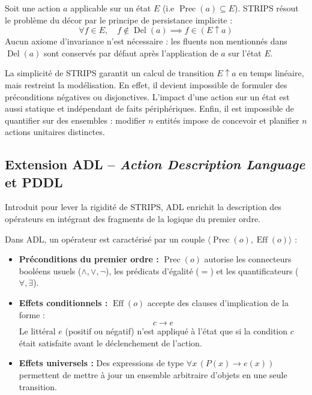 \begin{proposition}
    Soit une action $a$ applicable sur un état $E$ (i.e $\operatorname{Prec}(a) \subseteq E$). STRIPS résout le problème du décor par le principe de persistance implicite :
    \begin{equation}
        \forall f \in E, \quad f \notin \operatorname{Del}(a) \implies f \in (E \uparrow a)
    \end{equation}
    Aucun axiome d'invariance n'est nécessaire : les fluents non mentionnés dans $\operatorname{Del}(a)$ sont conservés par défaut après l'application de $a$ sur l'état $E$. 
\end{proposition}

\begin{remark}
    La simplicité de STRIPS garantit un calcul de transition $E \uparrow a$ en temps linéaire, mais restreint la modélisation. En effet, il devient impossible de formuler des préconditions négatives ou disjonctives. L'impact d'une action sur un état est aussi statique et indépendant de faits périphériques. Enfin, il est impossible de quantifier sur des ensembles : modifier $n$ entités impose de concevoir et planifier $n$ actions unitaires distinctes.
\end{remark}

\subsection{Extension ADL -- \emph{Action Description Language} et PDDL}

Introduit pour lever la rigidité de STRIPS, ADL enrichit la description des opérateurs en intégrant des fragments de la logique du premier ordre.

\begin{definition}
    Dans ADL, un opérateur est caractérisé par un couple $\langle \operatorname{Prec}(o), \operatorname{Eff}(o) \rangle$ :
    \begin{itemize}
        \item \textbf{Préconditions du premier ordre :} $\operatorname{Prec}(o)$ autorise les connecteurs booléens usuels ($\wedge, \vee, \neg$), les prédicats d'égalité ($=$) et les quantificateurs ($\forall, \exists$).
        \item \textbf{Effets conditionnels :} $\operatorname{Eff}(o)$ accepte des clauses d'implication de la forme :
        \begin{equation}
            c \longrightarrow e
        \end{equation}
        Le littéral $e$ (positif ou négatif) n'est appliqué à l'état que si la condition $c$ était satisfaite avant le déclenchement de l'action.
        \item \textbf{Effets universels :} Des expressions de type $\forall x \, (P(x) \to e(x))$ permettent de mettre à jour un ensemble arbitraire d'objets en une seule transition.
    \end{itemize}
\end{definition}

